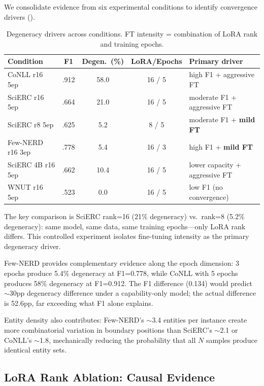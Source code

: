 \documentclass[11pt,a4paper]{article}
\begin{document}
We consolidate evidence from six experimental conditions to identify convergence drivers ().

\begin{table}[t]
\centering
\small
\caption{Degeneracy drivers across conditions. FT intensity = combination of LoRA rank and training epochs.}
\label{tab:drivers}
\begin{tabular}{lcccl}
\toprule
\textbf{Condition} & \textbf{F1} & \textbf{Degen.\ (\%)} & \textbf{LoRA/Epochs} & \textbf{Primary driver} \\
\midrule
CoNLL r16 5ep     & .912 & 58.0 & 16 / 5 & high F1 + aggressive FT \\
SciERC r16 5ep    & .664 & 21.0 & 16 / 5 & moderate F1 + aggressive FT \\
SciERC r8 5ep     & .625 &  5.2 & 8 / 5  & moderate F1 + \textbf{mild FT} \\
Few-NERD r16 3ep  & .778 &  5.4 & 16 / 3 & high F1 + \textbf{mild FT} \\
SciERC 4B r16 5ep & .662 & 10.4 & 16 / 5 & lower capacity + aggressive FT \\
WNUT r16 5ep      & .523 &  0.0 & 16 / 5 & low F1 (no convergence) \\
\bottomrule
\end{tabular}
\end{table}

The key comparison is SciERC rank=16 (21\% degeneracy) vs.\ rank=8 (5.2\% degeneracy): same model, same data, same training epochs---only LoRA rank differs.
This controlled experiment isolates fine-tuning intensity as the primary degeneracy driver.

Few-NERD provides complementary evidence along the epoch dimension: 3 epochs produce 5.4\% degeneracy at F1=0.778, while CoNLL with 5 epochs produces 58\% degeneracy at F1=0.912.
The F1 difference (0.134) would predict $\sim$30pp degeneracy difference under a capability-only model; the actual difference is 52.6pp, far exceeding what F1 alone explains.

Entity density also contributes: Few-NERD's $\sim$3.4 entities per instance create more combinatorial variation in boundary positions than SciERC's $\sim$2.1 or CoNLL's $\sim$1.8, mechanically reducing the probability that all $N$ samples produce identical entity sets.

\subsection{LoRA Rank Ablation: Causal Evidence}
\label{sec:ablation}
\end{document}
